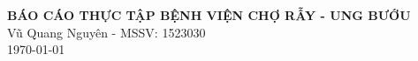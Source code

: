 \documentclass[10pt,a4paper]{extarticle}
\numberwithin{equation}{section}
\numberwithin{figure}{section}
\numberwithin{table}{section}
\begin{document}
\begin{center}
    \Large{\textbf{BÁO CÁO THỰC TẬP BỆNH VIỆN CHỢ RẪY - UNG BƯỚU}}\\
    \vspace{1.5em}
    \large{Vũ Quang Nguyên - MSSV: 1523030}\\
      \vspace{0.5em}
    \small{\today}
\end{center}
\setcounter{section}{0}

\end{document}
